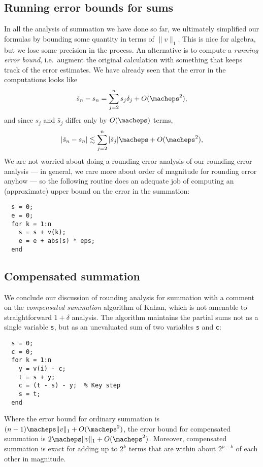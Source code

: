 \subsection{Running error bounds for sums}

In all the analysis of summation we have done so far, we ultimately
simplified our formulas by bounding some quantity in terms of $\|v\|_1$.
This is nice for algebra, but we lose some precision in the process.
An alternative is to compute a {\em running error bound}, i.e.~augment
the original calculation with something that keeps track of the error
estimates.  We have already seen that the error in the computations
looks like
\[
  \hat{s}_n-s_n = \sum_{j=2}^n s_j \delta_j + O(\macheps^2),
\]
and since $s_j$ and $\hat{s}_j$ differ only by $O(\macheps)$ terms,
\[
  |\hat{s}_n-s_n| \lesssim \sum_{j=2}^n |\hat{s}_j| \macheps + O(\macheps^2),
\]
We are not worried about doing a rounding error analysis of our rounding
error analysis --- in general, we care more about order of magnitude for
rounding error anyhow --- so the following routine does an adequate job
of computing an (approximate) upper bound on the error in the summation:
\begin{lstlisting}
  s = 0;
  e = 0;
  for k = 1:n
    s = s + v(k);
    e = e + abs(s) * eps;
  end
\end{lstlisting}

\subsection{Compensated summation}

We conclude our discussion of rounding analysis for summation
with a comment on the {\em compensated summation} algorithm of
Kahan, which is not amenable to straightforward $1+\delta$ analysis.
The algorithm maintains the partial sums not as a single variable
{\tt s}, but as an unevaluated sum of two
variables {\tt s} and {\tt c}:
\begin{lstlisting}
  s = 0;
  c = 0;
  for k = 1:n
    y = v(i) - c;
    t = s + y;
    c = (t - s) - y;  % Key step
    s = t;
  end
\end{lstlisting}
Where the error bound for ordinary summation is
$(n-1) \macheps \|v\|_1 + O(\macheps^2)$,
the error bound for compensated summation is
$2 \macheps \|v\|_1 + O(\macheps^2)$.  Moreover,
compensated summation is exact for adding up to $2^k$
terms that are within about $2^{p-k}$ of each other
in magnitude.

